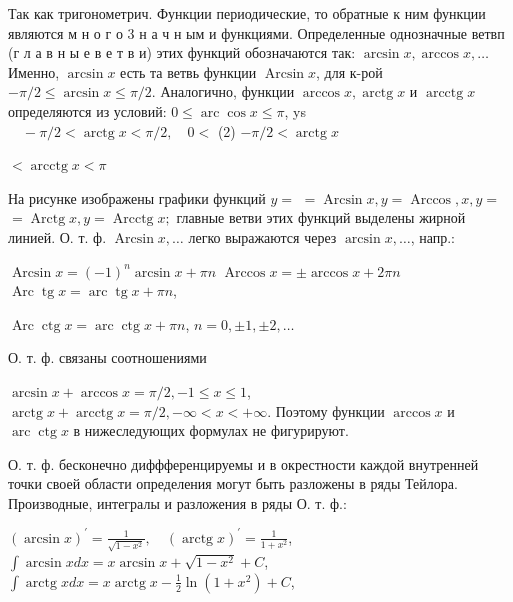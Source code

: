 \documentclass[10pt]{article}
\begin{document}
Так как тригонометрич. Функции периодические, то обратные к ним функции являются м н о г о 3 н а ч н ым и функциями. Определенные однозначные ветвп (г л а в н ы е в е т в и) этих функций обозначаются так: $\arcsin x, \arccos x, \ldots$ Именно, $\arcsin x$ есть та ветвь функции $\operatorname{Arcsin} x$, для к-рой $-\pi / 2 \leqslant \arcsin x \leqslant \pi / 2$. Аналогично, функции $\arccos x, \operatorname{arctg} x$ и $\operatorname{arcctg} x$ определяются из условий: $0 \leqslant \operatorname{arc} \cos x \leqslant \pi$, ys $\quad-\pi / 2<\operatorname{arctg} x<\pi / 2, \quad 0<$ (2) $-\pi / 2<\operatorname{arctg} x$

$<\operatorname{arcctg} x<\pi$



На рисунке изображены графики функций $y=$ $=\operatorname{Arcsin} x, y=\operatorname{Arccos}, x, y=$ $=\operatorname{Arctg} x, y=\operatorname{Arcctg} x ;$ главные ветви этих функций выделены жирной линией. О. т. ф. $\operatorname{Arcsin} x, \ldots$ легко выражаются через $\arcsin x, \ldots$, напр.:



$\operatorname{Arcsin} x=(-1)^{n} \arcsin x+\pi n$ $\operatorname{Arccos} x= \pm \arccos x+2 \pi n$ $\operatorname{Arc} \operatorname{tg} x=\operatorname{arc} \operatorname{tg} x+\pi n$,



$\operatorname{Arc} \operatorname{ctg} x=\operatorname{arc} \operatorname{ctg} x+\pi n$, $n=0, \pm 1, \pm 2, \ldots$



О. т. ф. связаны соотношениями



$\arcsin x+\arccos x=\pi / 2,-1 \leqslant x \leqslant 1$, $\operatorname{arctg} x+\operatorname{arcctg} x=\pi / 2,-\infty<x<+\infty$. Поэтому функции $\arccos x$ и $\operatorname{arc} \operatorname{ctg} x$ в нижеследующих формулах не фигурируют.



О. т. ф. бесконечно диффференцируемы и в окрестности каждой внутренней точки своей области определения могут быть разложены в ряды Тейлора. Производные, интегралы и разложения в ряды О. т. ф.:



$(\arcsin x)^{\prime}=\frac{1}{\sqrt{1-x^{2}}}, \quad(\operatorname{arctg} x)^{\prime}=\frac{1}{1+x^{2}}$, $\int \arcsin x d x=x \arcsin x+\sqrt{1-x^{2}}+C$, $\int \operatorname{arctg} x d x=x \operatorname{arctg} x-\frac{1}{2} \ln \left(1+x^{2}\right)+C$,
\end{document}
